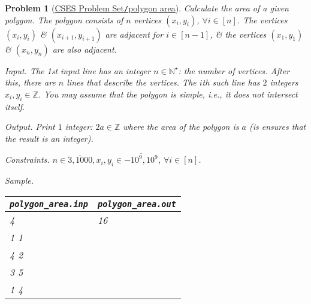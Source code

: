 \documentclass{article}
\newtheorem{problem}{Problem}
\begin{document}
\begin{problem}[\href{https://cses.fi/problemset/task/2191}{CSES Problem Set{\tt/}polygon area}]
    Calculate the area of a given polygon. The polygon consists of $n$ vertices $(x_i,y_i)$, $\forall i\in[n]$. The vertices $(x_i,y_i)$ \& $(x_{i+1},y_{i+1})$ are adjacent for $i\in[n - 1]$, \& the vertices $(x_1,y_1)$ \& $(x_n,y_n)$ are also adjacent.
    \item {\sf Input.} The 1st input line has an integer $n\in\mathbb{N}^\star$: the number of vertices. After this, there are $n$ lines that describe the vertices. The $i$th such line has $2$ integers $x_i,y_i\in\mathbb{Z}$. You may assume that the polygon is simple, i.e., it does not intersect itself.
    \item {\sf Output.} Print $1$ integer: $2a\in\mathbb{Z}$ where the area of the polygon is $a$ (is ensures that the result is an integer).
    \item {\sf Constraints.} $n\in\overline{3,1000},x_i,y_i\in\overline{-10^9,10^9}$, $\forall i\in[n]$.
    \item {\sf Sample.}
    \begin{table}[H]
        \centering
        \begin{tabular}{|l|l|}
            \hline
            \verb|polygon_area.inp| & \verb|polygon_area.out| \\
            \hline
            4 & 16 \\
            1 1 & \\
            4 2 & \\
            3 5 & \\
            1 4 & \\
            \hline
        \end{tabular}
    \end{table}
\end{problem}
\end{document}
